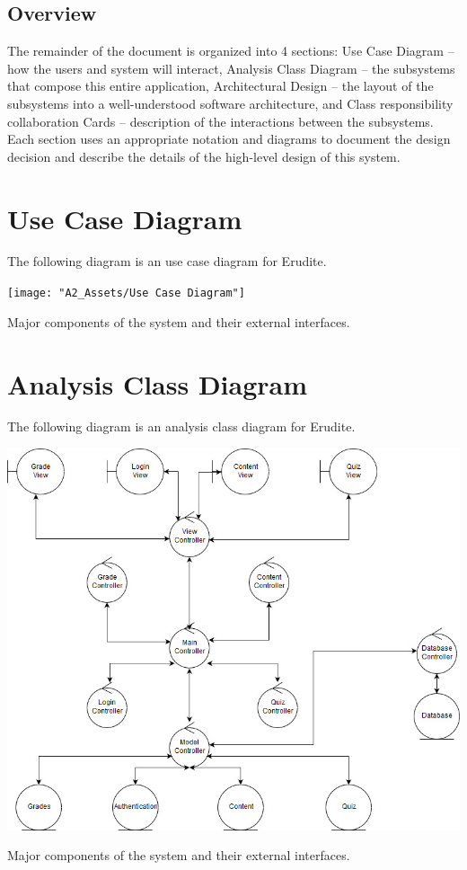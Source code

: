 \documentclass[]{article}
\begin{document}
\subsection{Overview}
\label{sub:overview}
The remainder of the document is organized into 4 sections: Use Case Diagram --
how the users and system will interact, Analysis Class Diagram -- the
subsystems that compose this entire application, Architectural Design -- the
layout of the subsystems into a well-understood software architecture, and
Class responsibility collaboration Cards -- description of the interactions
between the subsystems. Each section uses an appropriate notation and diagrams
to document the design decision and describe the details of the high-level
design of this system.




\newpage

\section{Use Case Diagram}
\label{sec:use_case_diagram}
The following diagram is an use case diagram for Erudite.\\

{
  \centering
    \texttt{[image: "A2\_Assets/Use Case Diagram"]}

  \centerline{Major components of the system and their external interfaces.}
}

\newpage

\section{Analysis Class Diagram}
\label{sec:analysis_class_diagram}
The following diagram is an analysis class diagram for Erudite.\\

{
  \centering
    \includegraphics[scale=0.5]{A2_Assets/Analysis_Class_Diagrm_v2.jpg}

  \centerline{Major components of the system and their external interfaces.}
}
\end{document}
